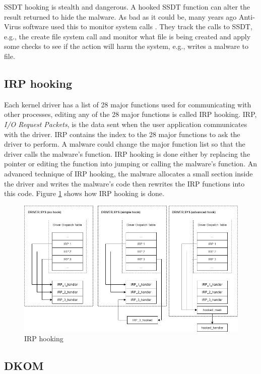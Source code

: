 SSDT hooking is stealth and dangerous. A hooked SSDT function can alter the
result returned to hide the malware. As bad as it could be, many years ago
Anti-Virus software used this to monitor system calls
\cite{case2020hooktracer}. They track the calls to SSDT, e.g., the create file
system call and monitor what file is being created and apply some checks to see
if the action will harm the system, e.g., writes a malware to file.

\subsection[IRP hooking]{IRP hooking}

Each kernel driver has a list of 28 major functions used for communicating with
other processes, editing any of the 28 major functions is called IRP hooking.
IRP, \textit{I/O Request Packets}, is the data sent when the user application
communicates with the driver. IRP contains the index to the 28 major functions
to ask the driver to perform. A malware could change the major function list so
that the driver calls the malware's function.  IRP hooking is done either by
replacing the pointer or editing the function into jumping or calling the
malware's function. An advanced technique of IRP hooking, the malware allocates
a small section inside the driver and writes the malware's code then rewrites
the IRP functions into this code. Figure \ref{fig:irp} shows how IRP hooking is
done.

\begin{figure}[h]
  \centering
  \caption{IRP hooking}
  \label{fig:irp}
  \includegraphics[scale=0.5]{images/irp.png}
\end{figure}

\subsection[DKOM]{DKOM}

